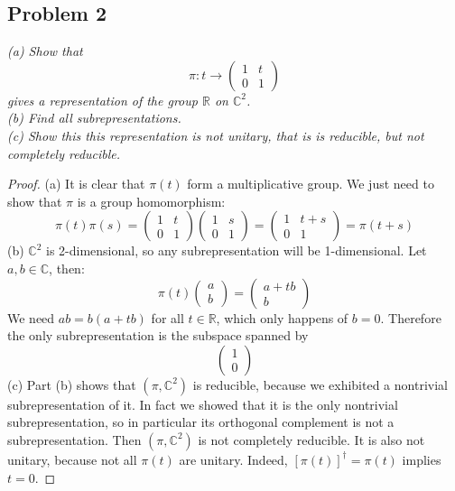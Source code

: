 \documentclass[12 pt]{article}
\newcommand{\R}{\mathbb{R}}
\newcommand{\C}{\mathbb{C}}
\begin{document}
\subsection*{Problem 2}
\emph{ (a) Show that
\[     \pi : t \to \left(  \begin{array} {cc} 1 & t \\ 0 & 1  \end{array} \right)     \]
gives a representation of the group $\R$ on $\C^2$.
\\
(b) Find all subrepresentations.
\\
(c) Show this this representation is not unitary, that is is reducible, but not completely reducible.}
\begin{proof}
(a) It is clear that $\pi(t)$ form a multiplicative group. We just need to show that $\pi$ is a group homomorphism:
\[      \pi(t) \pi(s) = \left(  \begin{array} {cc} 1 & t \\ 0 & 1  \end{array} \right) \left(  \begin{array} {cc} 1 & s \\ 0 & 1  \end{array} \right) = \left(  \begin{array} {cc} 1 & t+s \\ 0 & 1  \end{array} \right) = \pi(t+s)     \]
(b) $\C^2$ is 2-dimensional, so any subrepresentation will be 1-dimensional. Let $a,b \in \C$, then:
\[      \pi(t) \left(  \begin{array} {c} a \\ b  \end{array} \right)   =  \left(  \begin{array} {c} a+tb \\ b  \end{array} \right)  \]
We need $ab = b(a+tb)$ for all $t\in \R$, which only happens of $b=0$. Therefore the only subrepresentation is the subspace spanned by
\[     \left(  \begin{array} {c} 1 \\ 0  \end{array} \right)       \]
(c) Part (b) shows that $(\pi, \C^2)$ is reducible, because we exhibited a nontrivial subrepresentation of it. In fact we showed that it is the only nontrivial subrepresentation, so in particular its orthogonal complement is not a subrepresentation. Then $(\pi, \C^2)$ is not completely reducible. It is also not unitary, because not all $\pi(t)$ are unitary. Indeed, $[\pi(t)]^{\dagger} = \pi(t)$ implies $t=0$.
\end{proof}
\end{document}
